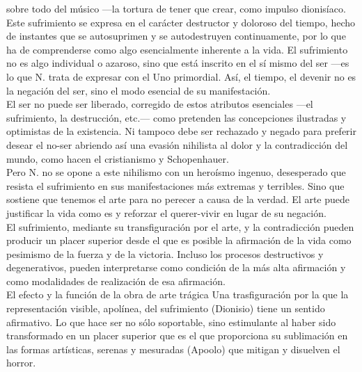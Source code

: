 \documentclass[a4paper, 10pt, twocolumn, spanish]{article}
\begin{document}
sobre todo del músico —la tortura de tener que crear, como impulso
dionisíaco.
Este sufrimiento se expresa en el carácter destructor y doloroso del
tiempo, hecho de instantes que se autosuprimen y se autodestruyen
continuamente, por lo que ha de comprenderse como algo esencialmente
inherente a la vida. El sufrimiento no es algo individual o azaroso,
sino que está inscrito en el sí mismo del ser —es lo que N. trata de
expresar con el Uno primordial. Así, el tiempo, el devenir no es la
negación del ser, sino el modo esencial de su manifestación.\\[0pt]
El ser no puede ser liberado, corregido de estos atributos esenciales
—el sufrimiento, la destrucción, etc.— como pretenden las concepciones
ilustradas y optimistas de la existencia. Ni tampoco debe ser
rechazado y negado para preferir desear el no-ser abriendo así una
evasión nihilista al dolor y la contradicción del mundo, como hacen el
cristianismo y Schopenhauer.\\[0pt]
Pero N. no se opone a este nihilismo con un heroísmo ingenuo,
desesperado que resista el sufrimiento en sus manifestaciones más
extremas y terribles. Sino que sostiene que tenemos el arte para no
perecer a causa de la verdad. El arte puede justificar la vida como es
y reforzar el querer-vivir en lugar de su negación.\\[0pt]
El sufrimiento, mediante su transfiguración por el arte, y la
contradicción pueden producir un placer superior desde el que es
posible la afirmación de la vida como pesimismo de la fuerza y de la
victoria. Incluso los procesos destructivos y degenerativos, pueden
interpretarse como condición de la más alta afirmación y como
modalidades de realización de esa afirmación.\\[0pt]
El efecto y la función de la obra de arte trágica Una trasfiguración
por la que la representación visible, apolínea, del sufrimiento
(Dionisio) tiene un sentido afirmativo. Lo que hace ser no sólo
soportable, sino estimulante al haber sido transformado en un placer
superior que es el que proporciona su sublimación en las formas
artísticas, serenas y mesuradas (Apoolo) que mitigan y disuelven el
horror.\\[0pt]
\end{document}
